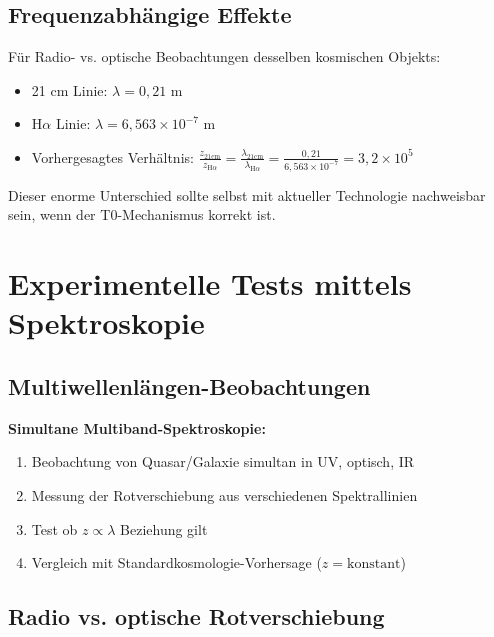 \documentclass[12pt,a4paper]{article}
\theoremstyle{definition}
\begin{document}
	\subsection{Frequenzabh\"angige Effekte}
	
	F\"ur Radio- vs. optische Beobachtungen desselben kosmischen Objekts:
	\begin{itemize}
		\item 21 cm Linie: $\lambda = 0,21$ m
		\item H$\alpha$ Linie: $\lambda = 6,563 \times 10^{-7}$ m
		\item Vorhergesagtes Verh\"altnis: $\frac{z_{21\text{cm}}}{z_{\text{H}\alpha}} = \frac{\lambda_{21\text{cm}}}{\lambda_{\text{H}\alpha}} = \frac{0,21}{6,563 \times 10^{-7}} = 3,2 \times 10^5$
	\end{itemize}
	
	Dieser enorme Unterschied sollte selbst mit aktueller Technologie nachweisbar sein, wenn der T0-Mechanismus korrekt ist.
	
	\section{Experimentelle Tests mittels Spektroskopie}
	\label{sec:experimental_tests}
	
	\subsection{Multiwellenl\"angen-Beobachtungen}
	
	\begin{experiment}
		\textbf{Simultane Multiband-Spektroskopie:}
		\begin{enumerate}
			\item Beobachtung von Quasar/Galaxie simultan in UV, optisch, IR
			\item Messung der Rotverschiebung aus verschiedenen Spektrallinien
			\item Test ob $z \propto \lambda$ Beziehung gilt
			\item Vergleich mit Standardkosmologie-Vorhersage ($z = \text{konstant}$)
		\end{enumerate}
	\end{experiment}
	
	\subsection{Radio vs. optische Rotverschiebung}
	
\end{document}
